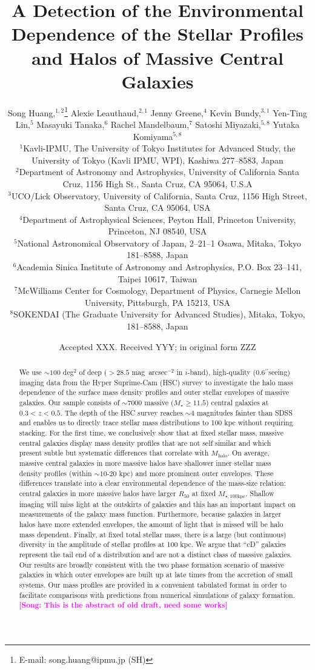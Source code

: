 \documentclass[a4paper,fleqn,usenatbib]{mnras}
\title[Structure and Environment of Massive Galaxies]{A Detection of the Environmental 
       Dependence of the Stellar Profiles and Halos of Massive Central Galaxies}
\author[S. Huang et al.]{
        Song Huang,$^{1,2}$\thanks{E-mail: song.huang@ipmu.jp (SH)}
        Alexie Leauthaud,$^{2,1}$
        Jenny Greene,$^{4}$
        Kevin Bundy,$^{3,1}$
        \newauthor
        Yen-Ting Lin,$^{5}$
        Masayuki Tanaka,$^{6}$
        Rachel Mandelbaum,$^{7}$
        Satoshi Miyazaki,$^{5,8}$
        \newauthor
        Yutaka Komiyama$^{5,8}$
        \\
        $^{1}$Kavli-IPMU, The University of Tokyo Institutes for Advanced Study, 
              the University of Tokyo (Kavli IPMU, WPI), Kashiwa 277--8583, Japan\\
        $^{2}$Department of Astronomy and Astrophysics, University of California 
              Santa Cruz, 1156 High St., Santa Cruz, CA 95064, U.S.A\\
        $^{3}$UCO/Lick Observatory, University of California, Santa Cruz,
              1156 High Street, Santa Cruz, CA 95064, USA\\
        $^{4}$Department of Astrophysical Sciences, Peyton Hall,
              Princeton University, Princeton, NJ 08540, USA \\
        $^{5}$National Astronomical Observatory of Japan, 2--21--1 Osawa, Mitaka, 
              Tokyo 181--8588, Japan\\
        $^{6}$Academia Sinica Institute of Astronomy and Astrophysics, 
              P.O. Box 23--141, Taipei 10617, Taiwan\\
        $^{7}$McWilliams Center for Cosmology, Department of Physics, 
              Carnegie Mellon University, Pittsburgh, PA 15213, USA\\
        $^{8}$SOKENDAI (The Graduate University for Advanced Studies), Mitaka,
              Tokyo, 181--8588, Japan
        }
\date{Accepted XXX. Received YYY; in original form ZZZ}
\def\asec{$^{\prime\prime}$}
\def\sb{mag~arcsec$^{-2}$}
\def\mstar{{$M_{\star}$}}
\def\mhalo{{$M_{\mathrm{halo}}$}}
\def\mtot{{$M_{\star,100\mathrm{kpc}}$}}
\newcommand{\song}[1]{\textcolor{magenta}{\textbf{[Song: #1]}}}
\begin{document}
\label{firstpage}
\pagerange{\pageref{firstpage}--\pageref{lastpage}}

\maketitle


\begin{abstract} 
    
    We use ${\sim}100$ deg$^2$ of deep ($>28.5$ \sb{} in $i$-band), high-quality 
    (0.6\asec seeing) imaging data from the Hyper Suprime-Cam (HSC) survey 
    to investigate the halo mass dependence of the surface mass density profiles 
    and outer stellar envelopes of massive galaxies. 
    Our sample consists of ${\sim}7000$ massive (\mstar{}$\geq 11.5$) central galaxies 
    at $0.3 < z < 0.5$. 
    The depth of the HSC survey reaches ${\sim}4$ magnitudes fainter than SDSS and 
    enables us to directly trace stellar mass distributions to 100 kpc without 
    requiring stacking. 
    For the first time, we conclusively show that at fixed stellar mass, massive central 
    galaxies display mass density profiles that are not self similar and which 
    present subtle but systematic differences that correlate with \mhalo{}. 
    On average, massive central galaxies in more massive halos have shallower inner 
    stellar mass density profiles (within ${\sim}10$-$20$ kpc) and more prominent outer 
    envelopes. 
    These differences translate into a clear environmental dependence of the mass-size 
    relation: central galaxies in more massive halos have larger $R_{\mathrm{50}}$ 
    at fixed \mtot{}. 
    Shallow imaging will miss light at the outskirts of galaxies and this has an 
    important impact on measurements of the galaxy mass function. 
    Furthermore, because galaxies in larger halos have more extended envelopes, 
    the amount of light that is missed will be halo mass dependent. 
    Finally, at fixed total stellar mass, there is a large (but continuous) diversity 
    in the amplitude of stellar profiles at 100 kpc. 
    We argue that ``cD'' galaxies represent the tail end of a distribution and 
    are not a distinct class of massive galaxies. 
    Our results are broadly consistent with the two phase formation scenario of 
    massive galaxies in which outer envelopes are built up at late times from the 
    accretion of small systems. 
    Our mass profiles are provided in a convenient tabulated format in order to 
    facilitate comparisons with predictions from numerical simulations of galaxy 
    formation. 
    \song{This is the abstract of old draft, need some works}
    
\end{abstract}
\end{document}
